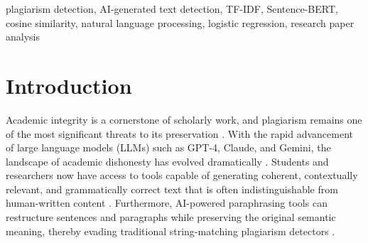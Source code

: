 \documentclass[conference]{IEEEtran}
\begin{document}
\begin{abstract}
The proliferation of AI-generated text and sophisticated paraphrasing tools has fundamentally challenged the integrity of academic writing. Traditional plagiarism detection systems that rely exclusively on lexical matching are increasingly inadequate against semantically restructured or machine-generated content. This paper presents CheckMate, a comprehensive web-based plagiarism and AI content detection system that employs a multi-model ensemble architecture combining three distinct analytical pipelines: TF-IDF with cosine similarity for verbatim copy detection, Sentence-BERT semantic embeddings for paraphrase identification, and a Logistic Regression classifier trained on labeled datasets for AI-generated content detection. The system computes a unified originality score using a weighted penalty formula with faculty-configurable weights, enabling institutional customization of detection sensitivity. The prototype is implemented as a Flask web application featuring role-based access control, PDF text extraction via PyMuPDF, automated arXiv paper import for corpus expansion, sentence-level content highlighting, and downloadable analysis reports. A reference corpus of over 100 research papers is maintained with automated SBERT dataset rebuilding. The combined approach achieves effective detection across copied, paraphrased, and AI-generated content categories, with the weighted ensemble providing a balanced and interpretable originality assessment.
\end{abstract}

\begin{IEEEkeywords}
plagiarism detection, AI-generated text detection, TF-IDF, Sentence-BERT, cosine similarity, natural language processing, logistic regression, research paper analysis
\end{IEEEkeywords}

\section{Introduction}

Academic integrity is a cornerstone of scholarly work, and plagiarism remains one of the most significant threats to its preservation \cite{b1}. With the rapid advancement of large language models (LLMs) such as GPT-4, Claude, and Gemini, the landscape of academic dishonesty has evolved dramatically \cite{b2}. Students and researchers now have access to tools capable of generating coherent, contextually relevant, and grammatically correct text that is often indistinguishable from human-written content \cite{b3}. Furthermore, AI-powered paraphrasing tools can restructure sentences and paragraphs while preserving the original semantic meaning, thereby evading traditional string-matching plagiarism detectors \cite{b4}.
\end{document}
